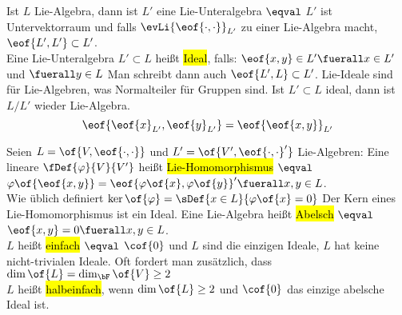 \begin{definition}
	Ist $L$ Lie-Algebra, dann ist $L'$ eine Lie-Unteralgebra $\eqval$ $L'$ ist Untervektorraum und falls $\evLi{\eof{\cdot,\cdot}}_{L'}$ zu einer Lie-Algebra macht, $\eof{L',L'} \subset L'$. \\
	Eine Lie-Unteralgebra $L' \subset L$ heißt \hl{Ideal}, falls: $\eof{x,y} \in L' \fuerall x \in L'$ und $\fuerall y \in L$ Man schreibt dann auch $\eof{L',L} \subset L'$. Lie-Ideale sind für Lie-Algebren, was Normalteiler  für Gruppen sind. Ist $L' \subset L$ ideal, dann ist $L/L'$ wieder Lie-Algebra.
	\begin{equation}
		\eof{\eof{x}_{L'},\eof{y}_{L'}} = \eof{\eof{x,y}}_{L'}
	\end{equation}
\end{definition}
\begin{definition}
	Seien $L = \of{V,\eof{\cdot,\cdot}}$ und $L' = \of{V',\eof{\cdot,\cdot}'}$ Lie-Algebren: Eine lineare \abb $\fDef{\varphi}{V}{V'}$ heißt \hl{Lie-Homomorphismus} $\eqval$ $\varphi\of{\eof{x,y}} = \eof{\varphi\of{x},\varphi\of{y}}' \fuerall x,y \in L$.  \\
	Wie üblich definiert $\ker\of{\varphi} = \sDef{x\in L}{\varphi\of{x} = 0}$ Der Kern eines Lie-Homomorphismus ist ein Ideal. Eine Lie-Algebra heißt \hl{Abelsch} $\eqval$ $\eof{x,y} = 0 \fuerall x,y \in L$. \\
	$L$ heißt \hl{einfach} $\eqval$ $\cof{0}$ und $L$ sind die einzigen Ideale, \dah $L$ hat keine nicht-trivialen Ideale. Oft fordert man zusätzlich, dass $\dim\of{L} = \dim_{\bF}\of{V} \geq 2$ \\
	$L$ heißt \hl{halbeinfach}, wenn $\dim\of{L} \geq 2$ und $\cof{0}$ das einzige abelsche Ideal ist.
\end{definition}
